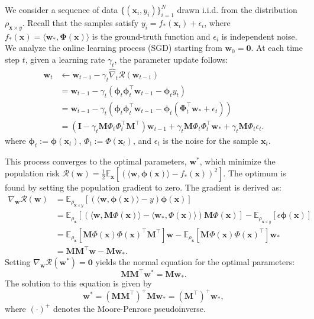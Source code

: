 \documentclass{article}
\theoremstyle{definition}
\theoremstyle{definition}
\theoremstyle{plain}
\theoremstyle{plain}
\theoremstyle{plain}
\theoremstyle{plain}
\theoremstyle{plain}
\newcommand{\bs}[1]{\boldsymbol{\mathbf{#1}}}
\newcommand{\Ex}{\mathbb{E}}
\newcommand{\vecx}{\mathbf{x}}
\newcommand{\M}{\mathbf{M}}
\newcommand{\w}{\mathbf{w}}
\newcommand{\id}{\mathbf{I}}
\begin{document}
We consider a sequence of data $\{(\vecx_i,y_i)\}_{i=1}^N$ drawn i.i.d. from the distribution $ \rho_{\vecx\times y}$. Recall that the samples satisfy $y_i = f_*(\vecx_i) + \epsilon_i$, where $f_*(\vecx) = \langle \w_*, \bs\Phi(\vecx) \rangle$ is the ground-truth function and $\epsilon_i$ is independent noise. We analyze the online learning process (SGD) starting from $\w_0 = \mathbf{0}$. At each time step $t$, given a learning rate $\gamma_t$, the parameter update follows:
\begin{equation}
\begin{aligned}\label{paraupdatedr}
\w_{t} &\leftarrow \w_{t-1} - \gamma_t \widehat\nabla_{{t}}\mathcal{R}(\w_{t-1}) \\
&= \w_{t-1} - \gamma_t \left( \bs\phi_{t}\bs\phi_{t}^\top \w_{t-1} - \bs\phi_{t} y_t \right) \\
&= \w_{t-1} - \gamma_t \left( \bs\phi_{t}\bs\phi_{t}^\top \w_{t-1} - \bs\phi_{t}(\bs\Phi_t^\top \w_* + \epsilon_t) \right) \\
&= \left(\id-\gamma_t\M\Phi_t\Phi_t^\top\M^\top\right) \w_{t-1}+\gamma_t\M\Phi_t\Phi_t^\top \w_* + \gamma_t \M\Phi_t \epsilon_t.\end{aligned}\end{equation}where $\bs\phi_{t} := \bs\phi(\vecx_t)$, $\Phi_t := \Phi(\vecx_t)$, and $\epsilon_t$ is the noise for the sample $\vecx_t$. 

This process converges to the optimal parameters, $\w^*$, which minimize the population risk $\mathcal{R}(\w) = \frac{1}{2}\Ex_\vecx[\left(\langle \w, \bs\phi(\vecx) \rangle - f_*(\vecx)\right)^2]$. The optimum is found by setting the population gradient to zero. The gradient is derived as:
\begin{equation}\label{paraupdategeneral}
\begin{aligned}
\nabla_{\w}\mathcal{R}(\w) &= \Ex_{\rho_{\vecx\times y}}\left[ \left(\langle \w, \bs\phi(\vecx) \rangle - y\right) \bs\phi(\vecx) \right] \\
&= \Ex_{\rho_{\vecx}}\left[ \left(\langle \w, \M\Phi(\vecx) \rangle - \langle \w_*, \Phi(\vecx) \rangle\right) \M\Phi(\vecx) \right] -\Ex_{\rho_{\vecx\times y}}[\epsilon\bs\phi(\vecx)]\\
&= \Ex_{\rho_{\vecx}}\left[ \M\Phi(\vecx)\Phi(\vecx)^\top\M^\top \right] \w - \Ex_{\rho_{\vecx}}\left[ \M\Phi(\vecx)\Phi(\vecx)^\top \right] \w_* \\
&= \M\M^\top \w - \M\w_*.
\end{aligned}
\end{equation}
Setting $\nabla_{\w}\mathcal{R}(\w^*) = \mathbf{0}$ yields the normal equation for the optimal parameters:
\begin{equation}
\M\M^\top \w^* = \M\w_*.
\end{equation}
The solution to this equation is given by 
\begin{equation}
\w^* = (\M\M^\top)^+ \M \w_* = (\M^\top)^+ \w_*,
\end{equation}
where $(\cdot)^+$ denotes the Moore-Penrose pseudoinverse.
\end{document}
